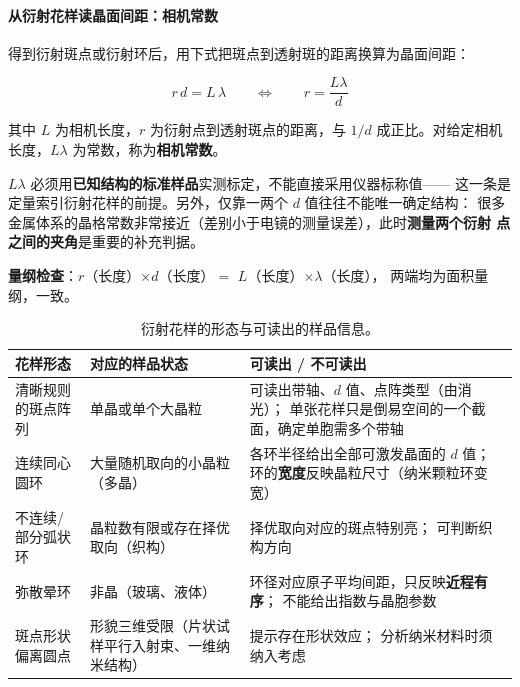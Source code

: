 \paragraph{从衍射花样读晶面间距：相机常数}
得到衍射斑点或衍射环后，用下式把斑点到透射斑的距离换算为晶面间距：

\begin{equation}\label{eq:camlen}
r\,d=L\,\lambda \qquad\Longleftrightarrow\qquad r=\frac{L\lambda}{d}
\end{equation}

其中 $L$ 为相机长度，$r$ 为衍射点到透射斑点的距离，与 $1/d$ 成正比。对给定相机
长度，$L\lambda$ 为常数，称为\textbf{相机常数}。
\begin{keycond}
$L\lambda$ 必须用\textbf{已知结构的标准样品}实测标定，不能直接采用仪器标称值——
这一条是定量索引衍射花样的前提。另外，仅靠一两个 $d$ 值往往不能唯一确定结构：
很多金属体系的晶格常数非常接近（差别小于电镜的测量误差），此时\textbf{测量两个衍射
点之间的夹角}是重要的补充判据。
\end{keycond}

\textbf{量纲检查}：$r$（长度）$\times d$（长度）$=$ $L$（长度）$\times\lambda$（长度），
两端均为面积量纲，一致。

\begin{table}[htbp]
\centering
\caption{衍射花样的形态与可读出的样品信息。}
\label{tab:pattern-read}
{\srcsize
\begin{tabular}{@{}>{\raggedright\arraybackslash}p{24mm}>{\raggedright\arraybackslash}p{36mm}>{\raggedright\arraybackslash}p{88mm}@{}}
\toprule
花样形态 & 对应的样品状态 & 可读出 / 不可读出 \\
\midrule
清晰规则的斑点阵列 & 单晶或单个大晶粒 & 可读出带轴、$d$ 值、点阵类型（由消光）；
单张花样只是倒易空间的一个截面，确定单胞需多个带轴 \\
连续同心圆环 & 大量随机取向的小晶粒（多晶） & 各环半径给出全部可激发晶面的 $d$ 值；
环的\textbf{宽度}反映晶粒尺寸（纳米颗粒环变宽） \\
不连续/部分弧状环 & 晶粒数有限或存在择优取向（织构） & 择优取向对应的斑点特别亮；
可判断织构方向 \\
弥散晕环 & 非晶（玻璃、液体） & 环径对应原子平均间距，只反映\textbf{近程有序}；
不能给出指数与晶胞参数 \\
斑点形状偏离圆点 & 形貌三维受限（片状试样平行入射束、一维纳米结构） & 提示存在形状效应；
分析纳米材料时须纳入考虑 \\
\bottomrule
\end{tabular}}
\end{table}

